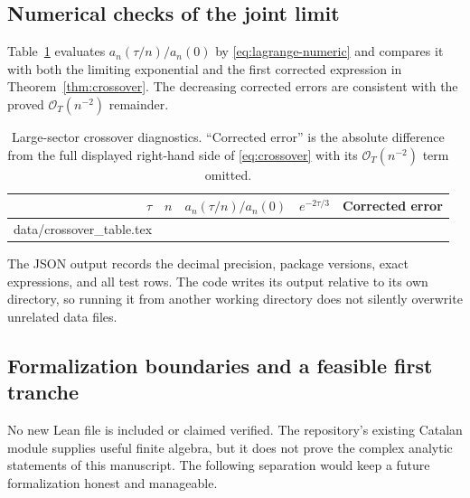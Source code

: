 \documentclass[11pt,a4paper]{article}
\makeatletter
\theoremstyle{definition}
\theoremstyle{remark}
\newcommand{\OO}{\mathcal O}
\newcommand{\tableinput}[1]{\@@input #1 }
\makeatother
\begin{document}
\subsection{Numerical checks of the joint limit}
Table~\ref{tab:crossover} evaluates
$a_n(\tau/n)/a_n(0)$ by \eqref{eq:lagrange-numeric} and compares it with
both the limiting exponential and the first corrected expression in
Theorem~\ref{thm:crossover}. The decreasing corrected errors are
consistent with the proved $\OO_T(n^{-2})$ remainder.

\begin{table}[htbp]
\centering
\small
\begin{tabular}{@{}rrrrr@{}}
\toprule
$\tau$ & $n$ & $a_n(\tau/n)/a_n(0)$ & $e^{-2\tau/3}$
 & {Corrected error}\\
\midrule
\tableinput{data/crossover_table.tex}
\bottomrule
\end{tabular}
\caption{Large-sector crossover diagnostics. ``Corrected error'' is the
absolute difference from the full displayed right-hand side of
\eqref{eq:crossover} with its $\OO_T(n^{-2})$ term omitted.}
\label{tab:crossover}
\end{table}

The JSON output records the decimal precision, package versions, exact
expressions, and all test rows. The code writes its output relative to
its own directory, so running it from another working directory does not
silently overwrite unrelated data files.

\subsection{Formalization boundaries and a feasible first tranche}
No new Lean file is included or claimed verified. The repository's
existing Catalan module supplies useful finite algebra, but it does not
prove the complex analytic statements of this manuscript. The following
separation would keep a future formalization honest and manageable.
\end{document}
